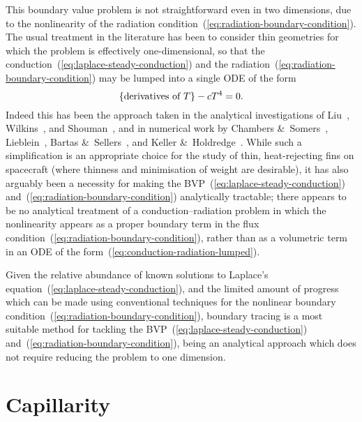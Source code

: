 This boundary value problem is not straightforward
even in two dimensions,
due to the nonlinearity of
the radiation condition~(\ref{eq:radiation-boundary-condition}).
The usual treatment in the literature has been to consider thin geometries
for which the problem is effectively one-dimensional,
so that the conduction~(\ref{eq:laplace-steady-conduction})
and the radiation~(\ref{eq:radiation-boundary-condition})
may be lumped into a single ODE of the form
\begin{equation}
  \left\{\text{derivatives of~$T$}\right\} - c T^4 = 0.
  \label{eq:conduction-radiation-lumped}
\end{equation}
Indeed this has been the approach taken in the analytical investigations of
Liu~\cite{liu-1960-minimum-rectangular-radiating-fins},
Wilkins~\cite{
  wilkins-1960-minumum-mass-fins-radiation,
  wilkins-1961-minimum-mass-fins-thickness,
  wilkins-1962-minimum-mass-fins-gradients,
  wilkins-1974-optimum-shapes-convection-radiation
},
and
Shouman~\cite{shouman-1968-exact-radiation-convection-fin},
and in numerical work by
Chambers \&~Somers~\cite{chambers-1959-radiation-fin-efficiency-circular},
Lieblein~\cite{lieblein-1959-radiant-fin-constant-thickness},
Bartas \&~Sellers~\cite{bartas-1960-radiation-fin-effectiveness},
and
Keller \&~Holdredge~\cite{keller-1970-radiation-annular-fins-trapezoidal}.
While such a simplification is an appropriate choice
for the study of thin, heat-rejecting fins on spacecraft
(where thinness and minimisation of weight are desirable),
it has also arguably been a necessity
for making the BVP~(\ref{eq:laplace-steady-conduction})
and~(\ref{eq:radiation-boundary-condition}) analytically tractable;
there appears to be no analytical treatment
of a conduction--radiation problem
in which the nonlinearity appears as a proper boundary term
in the flux condition~(\ref{eq:radiation-boundary-condition}),
rather than as a volumetric term in an ODE
of the form~(\ref{eq:conduction-radiation-lumped}).

Given the relative abundance of known solutions
to Laplace's equation~(\ref{eq:laplace-steady-conduction}),
and the limited amount of progress which can be made
using conventional techniques
for the nonlinear boundary condition~(\ref{eq:radiation-boundary-condition}),
boundary tracing is a most suitable method
for tackling the BVP~(\ref{eq:laplace-steady-conduction})
and~(\ref{eq:radiation-boundary-condition}),
being an analytical approach
which does not require reducing the problem to one dimension.

\section{Capillarity}
\label{sec:introduction.capillarity}

